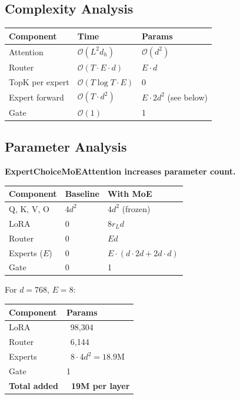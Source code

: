 \subsection{Complexity Analysis}

\begin{table}[H]
\centering
\small
\begin{tabular}{lll}
\toprule
\textbf{Component} & \textbf{Time} & \textbf{Params} \\
\midrule
Attention & $\mathcal{O}(L^2 d_h)$ & $\mathcal{O}(d^2)$ \\
Router & $\mathcal{O}(T \cdot E \cdot d)$ & $E \cdot d$ \\
TopK per expert & $\mathcal{O}(T \log T \cdot E)$ & 0 \\
Expert forward & $\mathcal{O}(T \cdot d^2)$ & $E \cdot 2d^2$ (see below) \\
Gate & $\mathcal{O}(1)$ & 1 \\
\bottomrule
\end{tabular}
\end{table}

\subsection{Parameter Analysis}

\textbf{ExpertChoiceMoEAttention increases parameter count.}

\begin{table}[H]
\centering
\small
\begin{tabular}{lll}
\toprule
\textbf{Component} & \textbf{Baseline} & \textbf{With MoE} \\
\midrule
Q, K, V, O & $4 d^2$ & $4 d^2$ (frozen) \\
LoRA & 0 & $8 r_L d$ \\
Router & 0 & $E d$ \\
Experts ($E$) & 0 & $E \cdot (d \cdot 2d + 2d \cdot d)$ \\
Gate & 0 & 1 \\
\bottomrule
\end{tabular}
\end{table}

For $d = 768$, $E = 8$:

\begin{table}[H]
\centering
\small
\begin{tabular}{ll}
\toprule
\textbf{Component} & \textbf{Params} \\
\midrule
LoRA & ~98,304 \\
Router & ~6,144 \\
Experts & ~$8 \cdot 4 d^2 = 18.9$M \\
Gate & 1 \\
\textbf{Total added} & \textbf{~19M per layer} \\
\bottomrule
\end{tabular}
\end{table}

